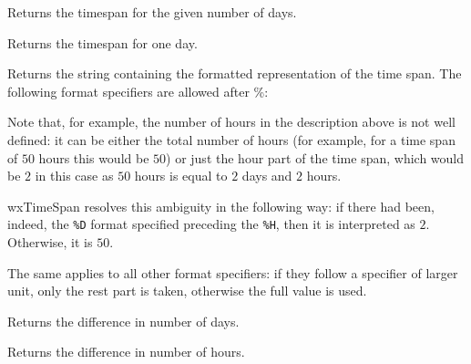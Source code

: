 Returns the timespan for the given number of days.

\label{wxtimespanday}


Returns the timespan for one day.

\label{wxtimespanformat}


Returns the string containing the formatted representation of the time span.
The following format specifiers are allowed after \%:

\twocolwidtha{5cm}%
\begin{twocollist}\itemsep=0pt
\end{twocollist}

Note that, for example, the number of hours in the description above is not
well defined: it can be either the total number of hours (for example, for a
time span of $50$ hours this would be $50$) or just the hour part of the time
span, which would be $2$ in this case as $50$ hours is equal to $2$ days and
$2$ hours.

wxTimeSpan resolves this ambiguity in the following way: if there had been,
indeed, the {\tt \%D} format specified preceding the {\tt \%H}, then it is
interpreted as $2$. Otherwise, it is $50$.

The same applies to all other format specifiers: if they follow a specifier of
larger unit, only the rest part is taken, otherwise the full value is used.

\label{wxtimespangetdays}


Returns the difference in number of days.

\label{wxtimespangethours}


Returns the difference in number of hours.

\label{wxtimespangetmilliseconds}

